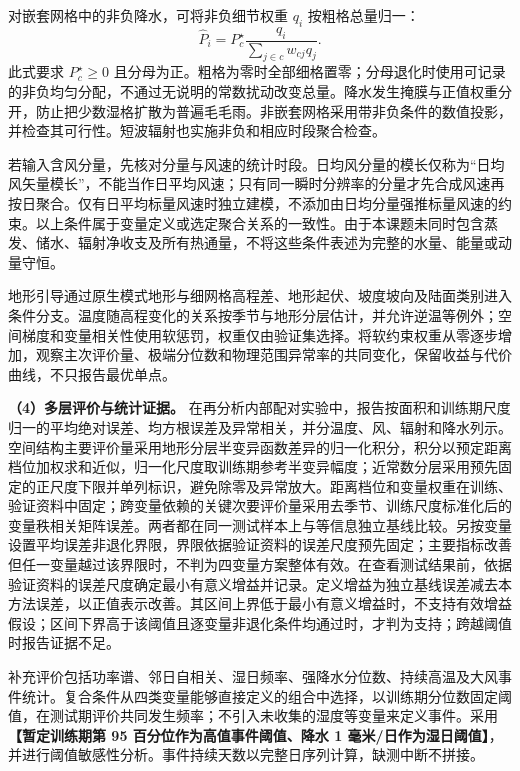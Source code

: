 对嵌套网格中的非负降水，可将非负细节权重 $q_i$ 按粗格总量归一：
\begin{equation}
\widehat{P}_i=P_c^{\star}\frac{q_i}{\sum_{j\in c}w_{cj}q_j}.
\end{equation}
此式要求 $P_c^{\star}\geq0$ 且分母为正。粗格为零时全部细格置零；分母退化时使用可记录的非负均匀分配，不通过无说明的常数扰动改变总量。降水发生掩膜与正值权重分开，防止把少数湿格扩散为普遍毛毛雨。非嵌套网格采用带非负条件的数值投影，并检查其可行性。短波辐射也实施非负和相应时段聚合检查。

若输入含风分量，先核对分量与风速的统计时段。日均风分量的模长仅称为“日均风矢量模长”，不能当作日平均风速；只有同一瞬时分辨率的分量才先合成风速再按日聚合。仅有日平均标量风速时独立建模，不添加由日均分量强推标量风速的约束。以上条件属于变量定义或选定聚合关系的一致性。由于本课题未同时包含蒸发、储水、辐射净收支及所有热通量，不将这些条件表述为完整的水量、能量或动量守恒。

地形引导通过原生模式地形与细网格高程差、地形起伏、坡度坡向及陆面类别进入条件分支。温度随高程变化的关系按季节与地形分层估计，并允许逆温等例外；空间梯度和变量相关性使用软惩罚，权重仅由验证集选择。将软约束权重从零逐步增加，观察主次评价量、极端分位数和物理范围异常率的共同变化，保留收益与代价曲线，不只报告最优单点。

\textbf{（4）多层评价与统计证据。}
在再分析内部配对实验中，报告按面积和训练期尺度归一的平均绝对误差、均方根误差及异常相关，并分温度、风、辐射和降水列示。空间结构主要评价量采用地形分层半变异函数差异的归一化积分，积分以预定距离档位加权求和近似，归一化尺度取训练期参考半变异幅度；近常数分层采用预先固定的正尺度下限并单列标识，避免除零及异常放大。距离档位和变量权重在训练、验证资料中固定；跨变量依赖的关键次要评价量采用去季节、训练尺度标准化后的变量秩相关矩阵误差。两者都在同一测试样本上与等信息独立基线比较。另按变量设置平均误差非退化界限，界限依据验证资料的误差尺度预先固定；主要指标改善但任一变量越过该界限时，不判为四变量方案整体有效。在查看测试结果前，依据验证资料的误差尺度确定最小有意义增益并记录。定义增益为独立基线误差减去本方法误差，以正值表示改善。其区间上界低于最小有意义增益时，不支持有效增益假设；区间下界高于该阈值且逐变量非退化条件均通过时，才判为支持；跨越阈值时报告证据不足。

补充评价包括功率谱、邻日自相关、湿日频率、强降水分位数、持续高温及大风事件统计。复合条件从四类变量能够直接定义的组合中选择，以训练期分位数固定阈值，在测试期评价共同发生频率；不引入未收集的湿度等变量来定义事件。采用\textbf{【暂定训练期第 95 百分位作为高值事件阈值、降水 1 毫米/日作为湿日阈值】}，并进行阈值敏感性分析。事件持续天数以完整日序列计算，缺测中断不拼接。

